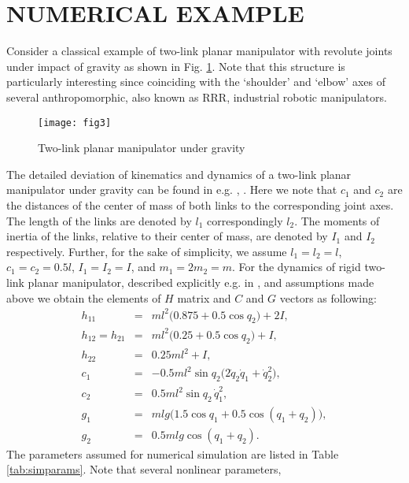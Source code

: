 \documentclass[a4paper, 10pt, conference]{ieeeconf}
\begin{document}
\section{NUMERICAL EXAMPLE}
\label{sec:5}

Consider a classical example of two-link planar manipulator with
revolute joints under impact of gravity as shown in Fig.
\ref{fig:planararm}. Note that this structure is particularly
interesting since coinciding with the `shoulder' and `elbow' axes
of several anthropomorphic, also known as RRR, industrial robotic
manipulators.
\begin{figure}[!h]
\centering
\texttt{[image: fig3]}
\caption{Two-link planar manipulator under gravity}
\label{fig:planararm}
\end{figure}
The detailed deviation of kinematics and dynamics of a two-link
planar manipulator under gravity can be found in e.g.
\cite{spong2006}, \cite{Sicil2009}. Here we note that $c_{1}$ and
$c_{2}$ are the distances of the center of mass of both links to
the corresponding joint axes. The length of the links are denoted
by $l_{1}$ correspondingly $l_{2}$. The moments of inertia of the
links, relative to their center of mass, are denoted by $I_{1}$
and $I_{2}$ respectively. Further, for the sake of simplicity, we
assume $l_{1} = l_{2} =l$, $c_{1} = c_{2} = 0.5l$, $I_{1} = I_{2}
= I$, and $m_{1} = 2m_{2} = m$. For the dynamics of rigid two-link
planar manipulator, described explicitly e.g. in
\cite{spong2006,Sicil2009}, and assumptions made above we obtain
the elements of $H$ matrix and $C$ and $G$ vectors as following:
\begin{eqnarray}
\nonumber   h_{11}        &=& ml^{2}\bigl(0.875 + 0.5 \cos q_{2}\bigr) +2I, \\
\nonumber   h_{12}=h_{21} &=& ml^{2}\bigl(0.25 + 0.5 \cos q_{2}\bigr) + I,\\
\nonumber   h_{22}        &=& 0.25 ml^{2} + I, \\
\nonumber   c_{1}         &=& -0.5 ml^{2} \sin q_{2}\bigl(2\dot{q}_{2}\dot{q}_{1} +\dot{q}_{2}^{2}\bigr),\\
\nonumber   c_{2}         &=& 0.5 ml^{2} \sin q_{2} \, \dot{q}_{1}^{2},\\
\nonumber   g_{1}         &=& m l g \bigl(1.5 \cos q_{1} + 0.5 \cos (q_{1} + q_{2})\bigr),  \\
  g_{2}         &=& 0.5 m l g \cos(q_{1} + q_{2}).
\end{eqnarray}
The parameters assumed for numerical simulation are listed in
Table \ref{tab:simparams}. Note that several nonlinear parameters,
\end{document}
